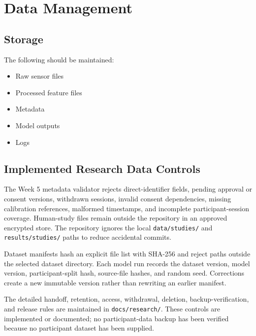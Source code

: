 \section{Data Management}
\label{sec:data-management}

\subsection{Storage}
\label{sec:data-storage}

The following should be maintained:
\begin{itemize}
    \item Raw sensor files
    \item Processed feature files
    \item Metadata
    \item Model outputs
    \item Logs
\end{itemize}

\subsection{Implemented Research Data Controls}
\label{sec:implemented-research-data-controls}

The Week 5 metadata validator rejects direct-identifier fields, pending approval or consent versions, withdrawn sessions, invalid consent dependencies, missing calibration references, malformed timestamps, and incomplete participant-session coverage. Human-study files remain outside the repository in an approved encrypted store. The repository ignores the local \texttt{data/studies/} and \texttt{results/studies/} paths to reduce accidental commits.

Dataset manifests hash an explicit file list with SHA-256 and reject paths outside the selected dataset directory. Each model run records the dataset version, model version, participant-split hash, source-file hashes, and random seed. Corrections create a new immutable version rather than rewriting an earlier manifest.

The detailed handoff, retention, access, withdrawal, deletion, backup-verification, and release rules are maintained in \texttt{docs/research/}. These controls are implemented or documented; no participant-data backup has been verified because no participant dataset has been supplied.

